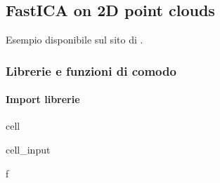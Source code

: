 \documentclass[letterpaper,10pt,italian]{jupyterBook}
\begin{document}
\sphinxstepscope


\subsection{FastICA on 2D point clouds}
\label{\detokenize{ch/ai/ica-pca-example-2d:fastica-on-2d-point-clouds}}\label{\detokenize{ch/ai/ica-pca-example-2d:ai-ul-ica-pca-example-2d}}\label{\detokenize{ch/ai/ica-pca-example-2d::doc}}
\sphinxAtStartPar
Esempio disponibile sul sito di .


\subsubsection{Librerie e funzioni di comodo}
\label{\detokenize{ch/ai/ica-pca-example-2d:librerie-e-funzioni-di-comodo}}

\paragraph{Import librerie}
\label{\detokenize{ch/ai/ica-pca-example-2d:import-librerie}}
\begin{sphinxuseclass}{cell}\begin{sphinxVerbatimInput}

\begin{sphinxuseclass}{cell_input}
\begin{sphinxVerbatim}[commandchars=\\\{\}]
 \PYGZhy{}f

   
    

   
\end{sphinxVerbatim}

\end{sphinxuseclass}\end{sphinxVerbatimInput}

\end{sphinxuseclass}
\end{document}
